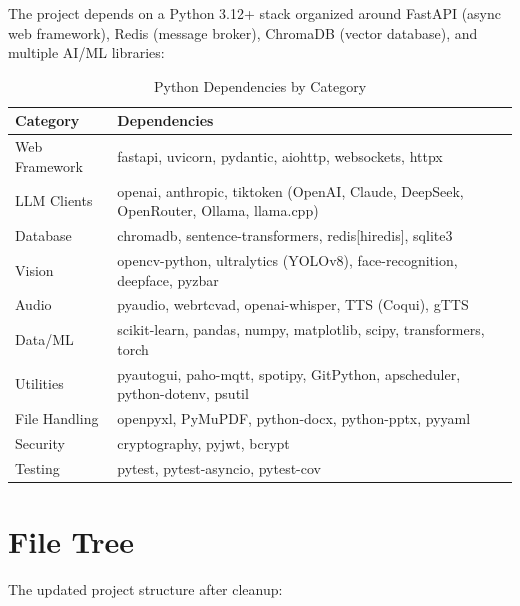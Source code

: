 \documentclass[12pt,a4paper,twoside]{report}
\begin{document}
The project depends on a Python 3.12+ stack organized around FastAPI (async web framework), Redis (message broker), ChromaDB (vector database), and multiple AI/ML libraries:

\begin{table}[H]
\centering
{}
\begin{tabularx}{\textwidth}{|l|X|}
\hline
\rowcolor{phiblue!20}
\textbf{Category} & \textbf{Dependencies} \\
\hline
Web Framework & fastapi, uvicorn, pydantic, aiohttp, websockets, httpx \\
\hline
LLM Clients & openai, anthropic, tiktoken (OpenAI, Claude, DeepSeek, OpenRouter, Ollama, llama.cpp) \\
\hline
Database & chromadb, sentence-transformers, redis[hiredis], sqlite3 \\
\hline
Vision & opencv-python, ultralytics (YOLOv8), face-recognition, deepface, pyzbar \\
\hline
Audio & pyaudio, webrtcvad, openai-whisper, TTS (Coqui), gTTS \\
\hline
Data/ML & scikit-learn, pandas, numpy, matplotlib, scipy, transformers, torch \\
\hline
Utilities & pyautogui, paho-mqtt, spotipy, GitPython, apscheduler, python-dotenv, psutil \\
\hline
File Handling & openpyxl, PyMuPDF, python-docx, python-pptx, pyyaml \\
\hline
Security & cryptography, pyjwt, bcrypt \\
\hline
Testing & pytest, pytest-asyncio, pytest-cov \\
\hline
\end{tabularx}
\caption{Python Dependencies by Category}
\end{table}

\section{File Tree}

The updated project structure after cleanup:
\end{document}
